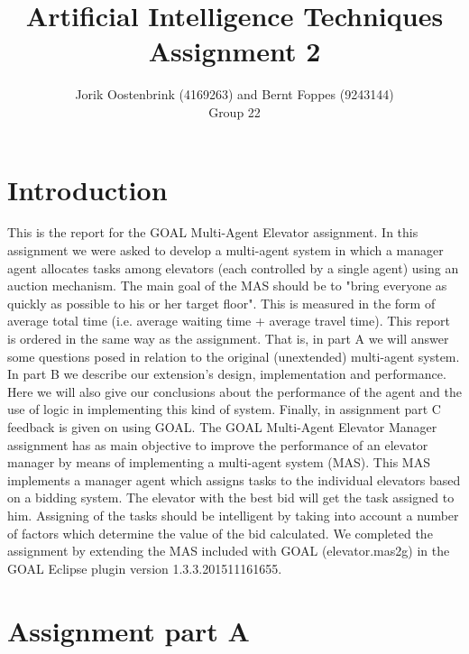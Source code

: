 \documentclass[a4paper,11pt]{article}
\title{Artificial Intelligence Techniques Assignment 2}
\author{Jorik Oostenbrink (4169263) and Bernt Foppes (9243144)\\ Group 22}
\date{}
\begin{document}
\maketitle	

\section{Introduction}
This is the report for the GOAL Multi-Agent Elevator assignment. In this assignment we were asked to develop a multi-agent system in which a manager agent allocates tasks among elevators (each controlled by a single agent) using an auction mechanism.
\newline\newline
The main goal of the MAS should be to "bring everyone as quickly as possible to his or her target floor". This is measured in the form of average total time (i.e. average waiting time + average travel time).
\newline\newline
This report is ordered in the same way as the assignment. That is, in part A we will answer some questions posed in relation to the original (unextended) multi-agent system. In part B we describe our extension's design, implementation and performance. Here we will also give our conclusions about the performance of the agent and the use of logic in implementing this kind of system. Finally, in assignment part C feedback is given on using GOAL.
\newline\newline
The GOAL Multi-Agent Elevator Manager assignment has as main objective to improve the performance of an elevator manager by means of implementing a multi-agent system (MAS). This MAS implements a manager agent which assigns tasks to the individual elevators based on a bidding system. The elevator with the best bid will get the task assigned to him. Assigning of the tasks should be intelligent by taking into account a number of factors which determine the value of the bid calculated. 
\newline\newline
We completed the assignment by extending the MAS included with GOAL (elevator.mas2g) in the GOAL Eclipse plugin version 1.3.3.201511161655.

\section{Assignment part A}
\end{document}
